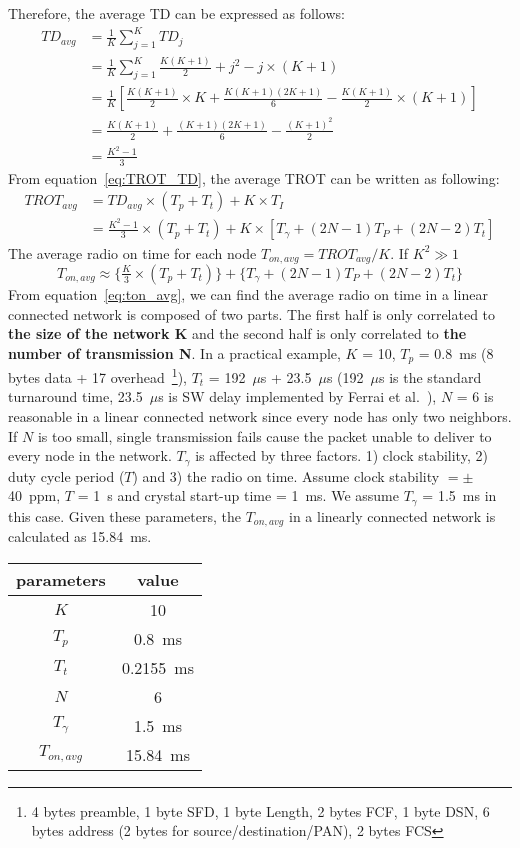 Therefore, the average TD can be expressed as follows:
\begin{align}
	TD_{avg} 	&= \tfrac{1}{K} \displaystyle\sum\limits_{j=1}^K TD_j\\
				&= \tfrac{1}{K} \displaystyle\sum\limits_{j=1}^K \tfrac{K(K+1)}{2} + j^2 - j\times(K+1)\\
				&= \tfrac{1}{K} [\tfrac{K(K+1)}{2}\times K + \tfrac{K(K+1)(2K+1)}{6} - \tfrac{K(K+1)}{2}\times(K+1)]\\
				&= \tfrac{K(K+1)}{2} + \tfrac{(K+1)(2K+1)}{6} - \tfrac{(K+1)^2}{2}\\
				&= \tfrac{K^2-1}{3}
\end{align}
From equation~\ref{eq:TROT_TD}, the average TROT can be written as following:
\begin{align}
	TROT_{avg} 	&= TD_{avg}\times(T_p + T_t) + K\times T_I\\
				&= \tfrac{K^2-1}{3}\times(T_p + T_t) + K\times[T_\gamma + (2N-1)T_P + (2N-2)T_t]
\end{align}
The average radio on time for each node $T_{on, avg} = TROT_{avg}/K$. If $K^2\gg1$
\begin{equation}
	T_{on, avg} \approx \{\tfrac{K}{3}\times(T_p + T_t)\} + \{T_\gamma + (2N-1)T_P + (2N-2)T_t\}
	\label{eq:ton_avg}
\end{equation}
From equation~\ref{eq:ton_avg}, we can find the average radio on time in a linear connected network
is composed of two parts. The first half is only correlated to {\bf the size of the network K} and the 
second half is only correlated to {\bf the number of transmission N}. In a practical example,
$K$ = 10, $T_p$ = 0.8~ms (8 bytes data + 17 overhead~\footnote{ 4 bytes preamble, 1 byte SFD, 1 byte Length,
2 bytes FCF, 1 byte DSN, 6 bytes address (2 bytes for source/destination/PAN), 2 bytes FCS
}), $T_t$ = 192~$\mu$s + 23.5~$\mu$s (192~$\mu$s is the standard
turnaround time, 23.5~$\mu$s is SW delay implemented by Ferrai et al.~\cite{ferrari:efficient}), $N$ = 6 is 
reasonable in a linear connected network since every node has only two neighbors. If $N$ is too small, 
single transmission fails cause the packet unable to deliver to every node in the network.  $T_\gamma$ is 
affected by three factors. 
1) clock stability, 2) duty cycle period ($T$) and 3) the radio on time. Assume clock stability $= \pm$40~ppm,
$T$ = 1~s and crystal start-up time = 1~ms. We assume $T_\gamma$ = 1.5~ms in this case. Given these parameters,
the $T_{on, avg}$ in a linearly connected network is calculated as 15.84~ms.
\begin{table}[h]
\centering
	\begin{tabular}{|c|c|}
	\hline
	{\bf parameters} & {\bf value}\\ \hline
	$K$ 	& 10\\ \hline
	$T_p$ 	& 0.8~ms\\ \hline
	$T_t$	& 0.2155~ms\\ \hline
	$N$		& 6\\ \hline
	$T_\gamma$& 1.5~ms\\ \hline\hline
	$T_{on, avg}$& 15.84~ms\\ \hline
	\end{tabular}
\end{table}

